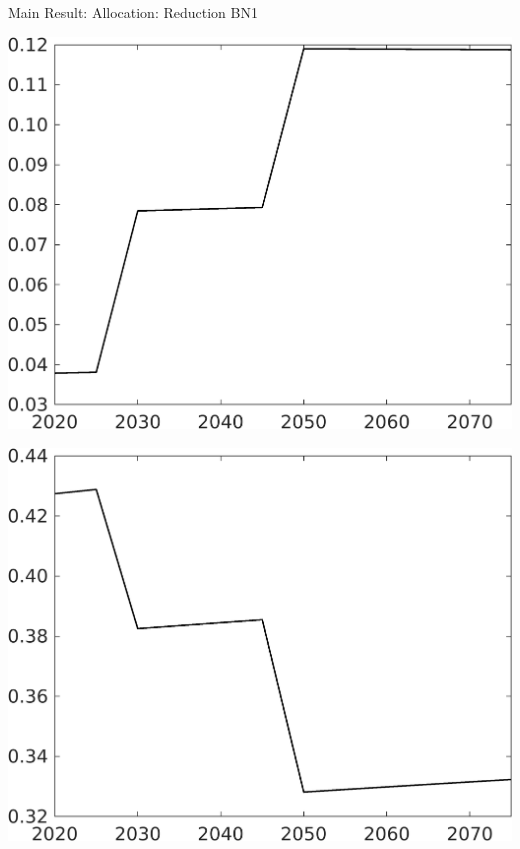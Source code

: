 \documentclass[11pt,aspectratio=169]{beamer}
\begin{document}
\begin{frame}{Main Result: Allocation: Reduction BN1}
\begin{minipage}[]{0.32\textwidth}
	\end{minipage}
	\begin{minipage}[]{0.32\textwidth}
		\includegraphics[width=1\textwidth]{../codding_model/own_basedOnFried/optimalPol_elastS_DisuSci/figures/all_1705/Single_OPT_T_NoTaus_sg_spillover0_sep1_BN1_ineq0_red0_etaa0.79.png}
	\end{minipage}
	\begin{minipage}[]{0.32\textwidth}
		\includegraphics[width=1\textwidth]{../codding_model/own_basedOnFried/optimalPol_elastS_DisuSci/figures/all_1705/Single_OPT_T_NoTaus_sn_spillover0_sep1_BN1_ineq0_red0_etaa0.79.png}

\end{minipage}
\end{frame}
\end{document}
